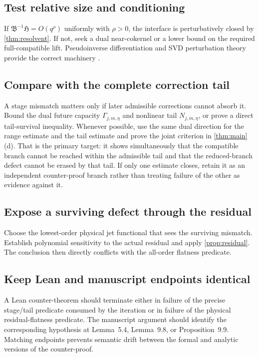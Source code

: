\documentclass[12pt]{article}
\theoremstyle{plain}
\theoremstyle{definition}
\theoremstyle{remark}
\newcommand{\Red}{\mathfrak B}
\newcommand{\Hidden}{\mathfrak H}
\begin{document}
\subsection{Test relative size and conditioning}
If \(\Red^{-1}\Hidden=O(q^\rho)\) uniformly with \(\rho>0\), the interface is perturbatively closed by \cref{thm:resolvent}. If not, seek a dual near-cokernel or a lower bound on the required full-compatible lift. Pseudoinverse differentiation and SVD perturbation theory provide the correct machinery \cite{GolubPereyra1973,Wedin1972}.

\subsection{Compare with the complete correction tail}
A stage mismatch matters only if later admissible corrections cannot absorb it. Bound the dual future capacity \(\Gamma_{j,m,\eta}\) and nonlinear tail \(N_{j,m,\eta}\), or prove a direct tail-survival inequality. Whenever possible, use the same dual direction for the range estimate and the tail estimate and prove the joint criterion in \cref{thm:main}(d). That is the primary target: it shows simultaneously that the compatible branch cannot be reached within the admissible tail and that the reduced-branch defect cannot be erased by that tail. If only one estimate closes, retain it as an independent counter-proof branch rather than treating failure of the other as evidence against it.

\subsection{Expose a surviving defect through the residual}
Choose the lowest-order physical jet functional that sees the surviving mismatch. Establish polynomial sensitivity to the actual residual and apply \cref{prop:residual}. The conclusion then directly conflicts with the all-order flatness predicate.

\subsection{Keep Lean and manuscript endpoints identical}
A Lean counter-theorem should terminate either in failure of the precise stage/tail predicate consumed by the iteration or in failure of the physical residual-flatness predicate. The manuscript argument should identify the corresponding hypothesis at Lemma~5.4, Lemma~9.8, or Proposition~9.9. Matching endpoints prevents semantic drift between the formal and analytic versions of the counter-proof.
\end{document}
